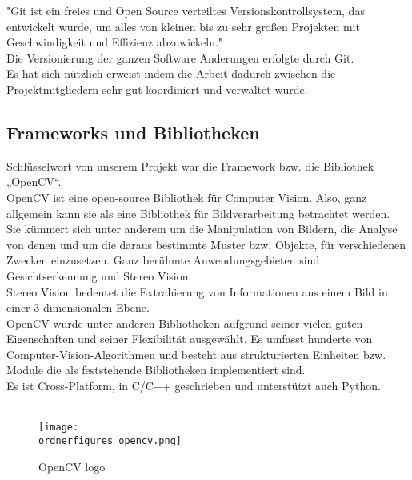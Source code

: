 "Git ist ein freies und Open Source verteiltes Versionskontrollsystem, das entwickelt wurde, um alles von kleinen bis zu sehr großen Projekten mit Geschwindigkeit und Effizienz abzuwickeln." \cite{Git1} \\
Die Versionierung der ganzen Software Änderungen erfolgte durch Git.\\
Es hat sich nützlich erweist indem die Arbeit dadurch zwischen die Projektmitgliedern sehr gut koordiniert und verwaltet wurde. \\ 


\subsection{Frameworks und Bibliotheken}

Schlüsselwort von unserem Projekt war die Framework bzw. die Bibliothek „OpenCV“.\\
OpenCV ist eine open-source Bibliothek für Computer Vision. Also, ganz allgemein kann sie als eine Bibliothek für Bildverarbeitung betrachtet werden.\\
Sie kümmert sich unter anderem um die Manipulation von Bildern, die Analyse von denen und um die daraus bestimmte Muster bzw. Objekte, für verschiedenen Zwecken einzusetzen. Ganz berühmte Anwendungsgebieten sind Gesichtserkennung und Stereo Vision. \\
Stereo Vision bedeutet die Extrahierung von Informationen aus einem Bild in einer 3-dimensionalen Ebene. \\
OpenCV wurde unter anderen Bibliotheken aufgrund seiner vielen guten Eigenschaften und seiner Flexibilität ausgewählt. Es umfasst hunderte von Computer-Vision-Algorithmen und besteht aus strukturierten Einheiten bzw. Module die als feststehende Bibliotheken implementiert sind. \\
Es ist Cross-Platform, in C/C++ geschrieben und unterstützt auch Python. \\
\cite{opencv_library}
\\
\begin{figure}[H]
	\texttt{[image: \\ordnerfigures opencv.png]}
	\caption{OpenCV logo}
	\label{fig:OpenCV logo}
\end{figure}\cite{OpencvLogo}


